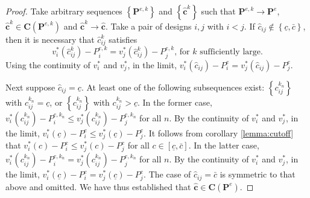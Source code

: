 \documentclass[14pt]{article}
\theoremstyle{plain}
\theoremstyle{definition}
\theoremstyle{remark}
\DeclareRobustCommand\1{\futurelet\oneNext\oneCheck}
\begin{document}
\begin{proof}
Take arbitrary sequences $\left\{ \mathbf{P}^{e,k}\right\} $ and $\left\{ 
\mathbf{\hat{c}}^{k}\right\} $ such that $\mathbf{P}^{e,k}\rightarrow 
\mathbf{P}^{e}$, $\mathbf{\hat{c}}^{k}\in \mathbf{C}\left( \mathbf{P}%
^{e,k}\right) $ and $\mathbf{\hat{c}}^{k}\rightarrow \mathbf{\hat{c}}$. Take
a pair of designs $i,j$ with $i<j$. If $\hat{c}_{ij}\notin \left\{ 
\underline{c},\bar{c}\right\} $, then it is necessary that $\hat{c}_{ij}^{k}$
satisfies%
\begin{equation*}
v_{i}^{\ast }\left( \hat{c}_{ij}^{k}\right) -P_{i}^{e,k}=v_{j}^{\ast }\left( 
\hat{c}_{ij}^{k}\right) -P_{j}^{e,k}\text{, for }k\text{ sufficiently large.}
\end{equation*}%
Using the continuity of $v_{i}^{\ast }$ and $v_{j}^{\ast }$, in the limit, $%
v_{i}^{\ast }\left( \hat{c}_{ij}\right) -P_{i}^{e}=v_{j}^{\ast }\left( \hat{c%
}_{ij}\right) -P_{j}^{e}$.

Next suppose $\hat{c}_{ij}=\underline{c}$. At least one of the following
subsequences exist: $\left\{ c_{ij}^{k_{n}}\right\} $ with $c_{ij}^{k_{n}}=%
\underline{c}$, or $\left\{ c_{ij}^{k_{n}}\right\} $ with $c_{ij}^{k_{n}}>%
\underline{c}$. In the former case, $v_{i}^{\ast }\left(
c_{ij}^{k_{n}}\right) -P_{i}^{e,k_{n}}\leq v_{j}^{\ast }\left(
c_{ij}^{k_{n}}\right) -P_{j}^{e,k_{n}}$ for all $n$. By the continuity of $%
v_{i}^{\ast }$ and $v_{j}^{\ast }$, in the limit, $v_{i}^{\ast }\left( 
\underline{c}\right) -P_{i}^{e}\leq v_{j}^{\ast }\left( \underline{c}\right)
-P_{j}^{e}$. It follows from corollary \ref{lemma:cutoff} that $v_{i}^{\ast }\left(
c\right) -P_{i}^{e}\leq v_{j}^{\ast }\left( c\right) -P_{j}^{e}$ for all $%
c\in \left[ \underline{c},\bar{c}\right] $. In the latter case, $v_{i}^{\ast
}\left( c_{ij}^{k_{n}}\right) -P_{i}^{e,k_{n}}=v_{j}^{\ast }\left(
c_{ij}^{k_{n}}\right) -P_{j}^{e,k_{n}}$ for all $n$. By the continuity of $%
v_{i}^{\ast }$ and $v_{j}^{\ast }$, in the limit, $v_{i}^{\ast }\left( 
\underline{c}\right) -P_{i}^{e}=v_{j}^{\ast }\left( \underline{c}\right)
-P_{j}^{e}$. The case of $\hat{c}_{ij}=\bar{c}$ is symmetric to that above and omitted.
We have thus established that $\mathbf{\hat{c}}\in \mathbf{C}\left( \mathbf{P%
}^{e}\right) $.
\end{proof}
\end{document}
